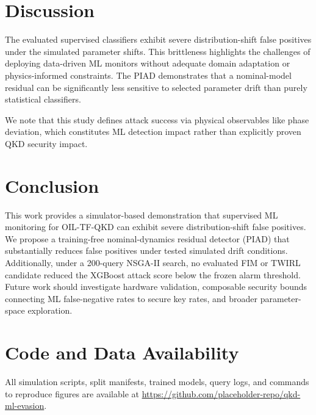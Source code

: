 \documentclass[journal,twocolumn]{IEEEtran}
\begin{document}
\section{Discussion}
\label{sec:discussion}

The evaluated supervised classifiers exhibit severe distribution-shift false positives under the simulated parameter shifts. This brittleness highlights the challenges of deploying data-driven ML monitors without adequate domain adaptation or physics-informed constraints. The PIAD demonstrates that a nominal-model residual can be significantly less sensitive to selected parameter drift than purely statistical classifiers.

We note that this study defines attack success via physical observables like phase deviation, which constitutes ML detection impact rather than explicitly proven QKD security impact. 

\section{Conclusion}
\label{sec:conclusion}

This work provides a simulator-based demonstration that supervised ML monitoring for OIL-TF-QKD can exhibit severe distribution-shift false positives. We propose a training-free nominal-dynamics residual detector (PIAD) that substantially reduces false positives under tested simulated drift conditions. Additionally, under a 200-query NSGA-II search, no evaluated FIM or TWIRL candidate reduced the XGBoost attack score below the frozen alarm threshold. Future work should investigate hardware validation, composable security bounds connecting ML false-negative rates to secure key rates, and broader parameter-space exploration.

\section*{Code and Data Availability}
All simulation scripts, split manifests, trained models, query logs, and commands to reproduce figures are available at \url{https://github.com/placeholder-repo/qkd-ml-evasion}.
\end{document}
